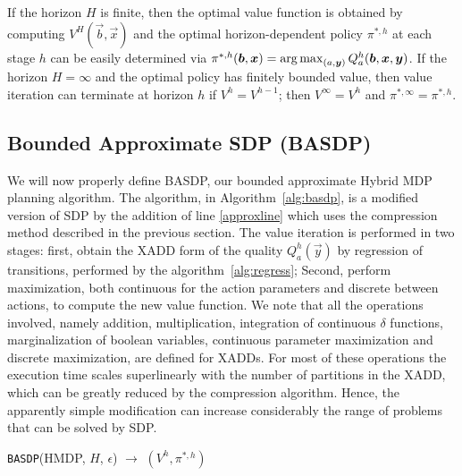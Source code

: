 If the horizon $H$ is finite, then the optimal value function is
obtained by computing $V^H(\vec{b},\vec{x})$ and the optimal
horizon-dependent policy $\pi^{*,h}$ at each stage $h$ can be easily
determined via $\pi^{*,h}(\vec{b},\vec{x}) = \argmax_{(a, \vec{y} )} Q^h_a(\vec{b},\vec{x},\vec{y})$.  If the horizon $H
= \infty$ and the optimal policy has finitely bounded value, then
value iteration can terminate at horizon $h$ if $V^{h} = V^{h-1}$;
then $V^\infty = V^h$ and $\pi^{*,\infty} = \pi^{*,h}$.


\subsection{Bounded Approximate SDP (BASDP)}
We will now properly define BASDP, our bounded approximate Hybrid MDP planning algorithm. The  algorithm, in Algorithm~\ref{alg:basdp}, is a modified version of SDP by the addition of line \ref{approxline} which uses the compression method described in the previous section. The value iteration is performed in two stages: first, obtain the XADD form of the quality $Q^h_a(\vec{y})$ by regression of transitions, performed by the algorithm~\ref{alg:regress}; Second, perform maximization, both continuous for the action parameters and discrete between actions, to compute the new value function. We note that all the operations involved, namely addition, multiplication, integration of continuous $\delta$ functions, marginalization of boolean variables, continuous parameter maximization and discrete maximization, are defined for XADDs. For most of these operations the execution time scales superlinearly with the number of partitions in the XADD, which can be greatly reduced by the compression algorithm. Hence, the apparently simple modification can increase considerably the range of problems that can be solved by SDP.

\incmargin{.5em}
\linesnumbered
\begin{algorithm}[th!]
\vspace{-.5mm}
\dontprintsemicolon
{}
\caption{\footnotesize \texttt{BASDP}(HMDP, $H$, $\epsilon$) $\longrightarrow$ $(V^h,\pi^{*,h})$ \label{alg:basdp}}
\vspace{-1mm}
\end{algorithm}
\decmargin{.5em}

